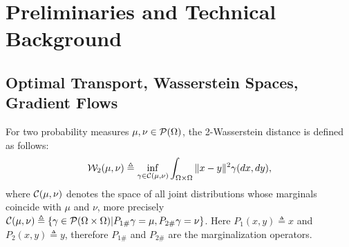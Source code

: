 
\section{Preliminaries and Technical Background}
\label{sec:techbg}




\subsection{Optimal Transport, Wasserstein Spaces, Gradient Flows}


For two probability measures $\mu,\nu \in {\cal P}(\Omega)$, the 2-Wasserstein distance is defined as follows:
\begin{align}
{\cal W}_2(\mu,\nu) \triangleq \inf_{\gamma \in {\cal C}(\mu,\nu)} \int_{\Omega \times \Omega} \|x-y\|^2 \gamma(dx , dy),
\end{align}
where ${\cal C}(\mu,\nu)$ denotes the space of all joint distributions whose marginals coincide with $\mu$ and $\nu$, more precisely ${\cal C}(\mu,\nu) \triangleq \{\gamma \in {\cal P}(\Omega \times \Omega) | P_{1\#}\gamma = \mu, P_{2\#}\gamma = \nu  \}$. Here $P_1(x,y) \triangleq x$ and $P_2(x,y) \triangleq y$, therefore $P_{1\#}$ and $P_{2\#}$ are the marginalization operators.






